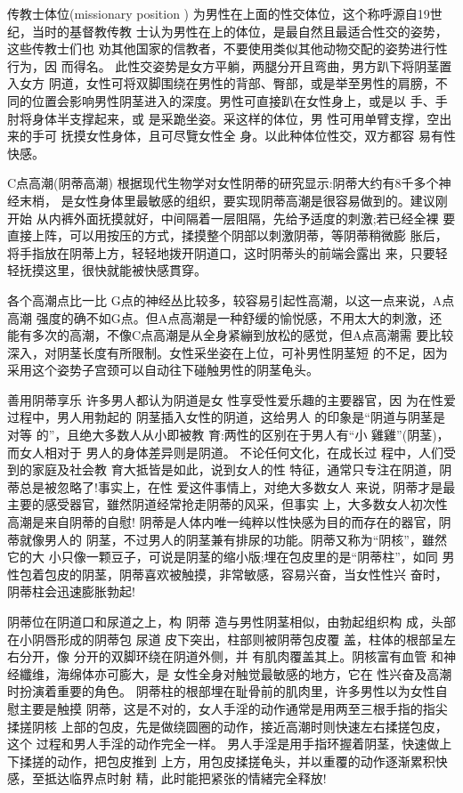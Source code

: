 \documentclass[12pt,UTF8]{ctexbook}
\begin{document}
传教士体位(missionary position )
为男性在上面的性交体位，这个称呼源自19世纪，当时的基督教传教
士认为男性在上的体位，是最自然且最适合性交的姿势，这些传教士们也
劝其他国家的信教者，不要使用类似其他动物交配的姿势进行性行为，因
而得名。
此性交姿势是女方平躺，两腿分开且弯曲，男方趴下将阴茎置入女方
阴道，女性可将双脚围绕在男性的背部、臀部，或是举至男性的肩膀，不
同的位置会影响男性阴茎进入的深度。男性可直接趴在女性身上，或是以
手、手肘将身体半支撑起来，或
是采跪坐姿。采这样的体位，男
性可用单臂支撑，空出来的手可
抚摸女性身体，且可尽覽女性全
身。以此种体位性交，双方都容
易有性快感。

C点高潮(阴蒂高潮)
根据现代生物学对女性阴蒂的研究显示:阴蒂大约有8千多个神经末梢，
是女性身体里最敏感的组织，要实现阴蒂高潮是很容易做到的。建议刚开始
从内裤外面抚摸就好，中间隔着一层阻隔，先给予适度的刺激;若已经全裸
要直接上阵，可以用按压的方式，揉摸整个阴部以刺激阴蒂，等阴蒂稍微膨
胀后，将手指放在阴蒂上方，轻轻地拨开阴道口，这时阴蒂头的前端会露出
来，只要轻轻抚摸这里，很快就能被快感貫穿。

各个高潮点比一比
G点的神经丛比较多，较容易引起性高潮，以这一点来说，A点高潮
强度的确不如G点。但A点高潮是一种舒缓的愉悦感，不用太大的刺激，还
能有多次的高潮，不像C点高潮是从全身紧繃到放松的感觉，但A点高潮需
要比较深入，对阴茎长度有所限制。女性采坐姿在上位，可补男性阴茎短
的不足，因为采用这个姿势子宫颈可以自动往下碰触男性的阴茎龟头。

善用阴蒂享乐
许多男人都认为阴道是女
性享受性爱乐趣的主要器官，因
为在性爱过程中，男人用勃起的
阴茎插入女性的阴道，这给男人
的印象是“阴道与阴茎是对等
的”，且绝大多数人从小即被教
育:两性的区别在于男人有“小
雞雞”(阴茎)，而女人相对于
男人的身体差异则是阴道。
不论任何文化，在成长过
程中，人们受到的家庭及社会教
育大抵皆是如此，说到女人的性
特征，通常只专注在阴道，阴蒂总是被忽略了!事实上，在性
爱这件事情上，对绝大多数女人
来说，阴蒂才是最主要的感受器官，雖然阴道经常抢走阴蒂的风采，但事实
上，大多数女人初次性高潮是来自阴蒂的自慰!
阴蒂是人体内唯一纯粹以性快感为目的而存在的器官，阴蒂就像男人的
阴茎，不过男人的阴茎兼有排尿的功能。阴蒂又称为“阴核”，雖然它的大
小只像一颗豆子，可说是阴茎的缩小版;埋在包皮里的是“阴蒂柱”，如同
男性包着包皮的阴茎，阴蒂喜欢被触摸，非常敏感，容易兴奋，当女性性兴
奋时，阴蒂柱会迅速膨胀勃起!

阴蒂位在阴道口和尿道之上，构
阴蒂
造与男性阴茎相似，由勃起组织构
成，头部在小阴唇形成的阴蒂包
尿道
皮下突出，柱部则被阴蒂包皮覆
盖，柱体的根部呈左右分开，像
分开的双脚环绕在阴道外侧，并
有肌肉覆盖其上。阴核富有血管
和神经纖维，海绵体亦可膨大，是
女性全身对触觉最敏感的地方，它在
性兴奋及高潮时扮演着重要的角色。
阴蒂柱的根部埋在耻骨前的肌肉里，许多男性以为女性自慰主要是触摸
阴蒂，这是不对的，女人手淫的动作通常是用两至三根手指的指尖揉搓阴核
上部的包皮，先是做绕圆圈的动作，接近高潮时则快速左右揉搓包皮，这个
过程和男人手淫的动作完全一样。
男人手淫是用手指环握着阴茎，快速做上下揉搓的动作，把包皮推到
上方，用包皮揉搓龟头，并以重覆的动作逐渐累积快感，至抵达临界点时射
精，此时能把紧张的情緒完全释放!
\end{document}
